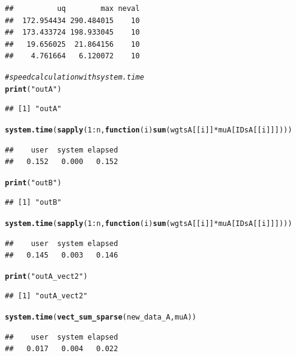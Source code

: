 \documentclass{llncs}\usepackage[]{graphicx}\usepackage[]{color}
\makeatletter
\newcommand{\hlnum}[1]{\textcolor[rgb]{0.686,0.059,0.569}{#1}}%
\newcommand{\hlstr}[1]{\textcolor[rgb]{0.192,0.494,0.8}{#1}}%
\newcommand{\hlcom}[1]{\textcolor[rgb]{0.678,0.584,0.686}{\textit{#1}}}%
\newcommand{\hlopt}[1]{\textcolor[rgb]{0,0,0}{#1}}%
\newcommand{\hlstd}[1]{\textcolor[rgb]{0.345,0.345,0.345}{#1}}%
\newcommand{\hlkwa}[1]{\textcolor[rgb]{0.161,0.373,0.58}{\textbf{#1}}}%
\newcommand{\hlkwc}[1]{\textcolor[rgb]{0.333,0.667,0.333}{#1}}%
\newcommand{\hlkwd}[1]{\textcolor[rgb]{0.737,0.353,0.396}{\textbf{#1}}}%
\newenvironment{kframe}{%
 \def\at@end@of@kframe{}%
 \ifinner\ifhmode%
  \def\at@end@of@kframe{\end{minipage}}%
  \begin{minipage}{\columnwidth}%
 \fi\fi%
 \def\FrameCommand##1{\hskip\@totalleftmargin \hskip-\fboxsep
 \colorbox{shadecolor}{##1}\hskip-\fboxsep
     \hskip-\linewidth \hskip-\@totalleftmargin \hskip\columnwidth}%
 \MakeFramed {\advance\hsize-\width
   \@totalleftmargin\z@ \linewidth\hsize
   \@setminipage}}%
 {\par\unskip\endMakeFramed%
 \at@end@of@kframe}
\newenvironment{knitrout}{}{} %
\makeatother
\begin{document}
\begin{knitrout}
\begin{kframe}
\begin{lstlisting}[basicstyle=\ttfamily,breaklines=true]
##          uq        max neval
##  172.954434 290.484015    10
##  173.433724 198.933045    10
##   19.656025  21.864156    10
##    4.761664   6.120072    10
\end{lstlisting}
\begin{alltt}
\hlcom{# speed calculation with system.time}
\hlkwd{print}\hlstd{(}\hlstr{"outA"}\hlstd{)}
\end{alltt}
\begin{lstlisting}[basicstyle=\ttfamily,breaklines=true]
## [1] "outA"
\end{lstlisting}
\begin{alltt}
\hlkwd{system.time}\hlstd{(}\hlkwd{sapply}\hlstd{(}\hlnum{1}\hlopt{:}\hlstd{n,}\hlkwa{function}\hlstd{(}\hlkwc{i}\hlstd{)} \hlkwd{sum}\hlstd{(wgtsA[[i]]}\hlopt{*}\hlstd{muA[IDsA[[i]]])))}
\end{alltt}
\begin{lstlisting}[basicstyle=\ttfamily,breaklines=true]
##    user  system elapsed 
##   0.152   0.000   0.152
\end{lstlisting}
\begin{alltt}
\hlkwd{print}\hlstd{(}\hlstr{"outB"}\hlstd{)}
\end{alltt}
\begin{lstlisting}[basicstyle=\ttfamily,breaklines=true]
## [1] "outB"
\end{lstlisting}
\begin{alltt}
\hlkwd{system.time}\hlstd{(}\hlkwd{sapply}\hlstd{(}\hlnum{1}\hlopt{:}\hlstd{n,}\hlkwa{function}\hlstd{(}\hlkwc{i}\hlstd{)} \hlkwd{sum}\hlstd{(wgtsA[[i]]}\hlopt{*}\hlstd{muA[IDsA[[i]]])))}
\end{alltt}
\begin{lstlisting}[basicstyle=\ttfamily,breaklines=true]
##    user  system elapsed 
##   0.145   0.003   0.146
\end{lstlisting}
\begin{alltt}
\hlkwd{print}\hlstd{(}\hlstr{"outA_vect2"}\hlstd{)}
\end{alltt}
\begin{lstlisting}[basicstyle=\ttfamily,breaklines=true]
## [1] "outA_vect2"
\end{lstlisting}
\begin{alltt}
\hlkwd{system.time}\hlstd{(}\hlkwd{vect_sum_sparse}\hlstd{(new_data_A,muA))}
\end{alltt}
\begin{lstlisting}[basicstyle=\ttfamily,breaklines=true]
##    user  system elapsed 
##   0.017   0.004   0.022
\end{lstlisting}

\end{kframe}
\end{knitrout}
\end{document}
